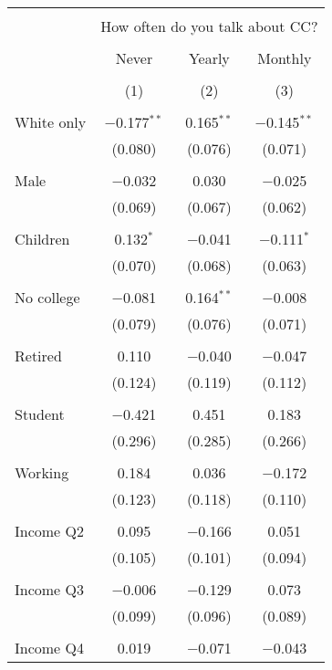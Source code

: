 
\begin{tabular}{@{\extracolsep{5pt}}lccc} 
\\[-1.8ex]\hline 
\hline \\[-1.8ex] 
 & \multicolumn{3}{c}{How often do you talk about CC?} \\ 
\cline{2-4} 
\\[-1.8ex] & Never & Yearly & Monthly \\ 
\\[-1.8ex] & (1) & (2) & (3)\\ 
\hline \\[-1.8ex] 
 White only & $-$0.177$^{**}$ & 0.165$^{**}$ & $-$0.145$^{**}$ \\ 
  & (0.080) & (0.076) & (0.071) \\ 
  & & & \\ 
 Male & $-$0.032 & 0.030 & $-$0.025 \\ 
  & (0.069) & (0.067) & (0.062) \\ 
  & & & \\ 
 Children & 0.132$^{*}$ & $-$0.041 & $-$0.111$^{*}$ \\ 
  & (0.070) & (0.068) & (0.063) \\ 
  & & & \\ 
 No college & $-$0.081 & 0.164$^{**}$ & $-$0.008 \\ 
  & (0.079) & (0.076) & (0.071) \\ 
  & & & \\ 
 Retired & 0.110 & $-$0.040 & $-$0.047 \\ 
  & (0.124) & (0.119) & (0.112) \\ 
  & & & \\ 
 Student & $-$0.421 & 0.451 & 0.183 \\ 
  & (0.296) & (0.285) & (0.266) \\ 
  & & & \\ 
 Working & 0.184 & 0.036 & $-$0.172 \\ 
  & (0.123) & (0.118) & (0.110) \\ 
  & & & \\ 
 Income Q2 & 0.095 & $-$0.166 & 0.051 \\ 
  & (0.105) & (0.101) & (0.094) \\ 
  & & & \\ 
 Income Q3 & $-$0.006 & $-$0.129 & 0.073 \\ 
  & (0.099) & (0.096) & (0.089) \\ 
  & & & \\ 
 Income Q4 & 0.019 & $-$0.071 & $-$0.043 \\ 

\end{tabular}
